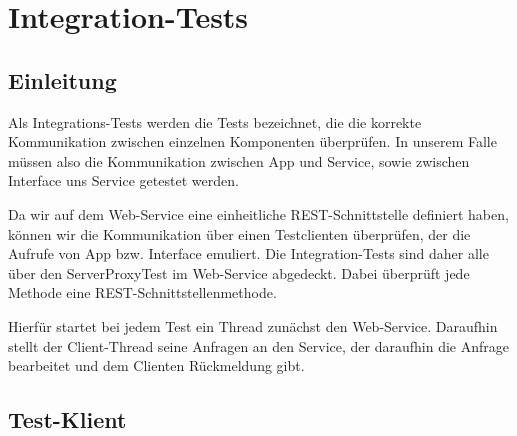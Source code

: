 \section{Integration-Tests}

\subsection{Einleitung}

Als Integrations-Tests werden die Tests bezeichnet, die die korrekte Kommunikation zwischen einzelnen Komponenten überprüfen. In unserem Falle müssen also die Kommunikation zwischen App und Service, sowie zwischen Interface uns Service getestet werden.\par
Da wir auf dem Web-Service eine einheitliche REST-Schnittstelle definiert haben, können wir die Kommunikation über einen  Testclienten überprüfen, der die Aufrufe von App bzw. Interface emuliert. Die Integration-Tests sind daher alle über den ServerProxyTest im Web-Service abgedeckt. Dabei überprüft jede Methode eine REST-Schnittstellenmethode.\par 
Hierfür startet bei jedem Test ein Thread zunächst den Web-Service. Daraufhin stellt der Client-Thread seine Anfragen an den Service, der daraufhin die Anfrage bearbeitet und dem Clienten Rückmeldung gibt.

\subsection{Test-Klient}

